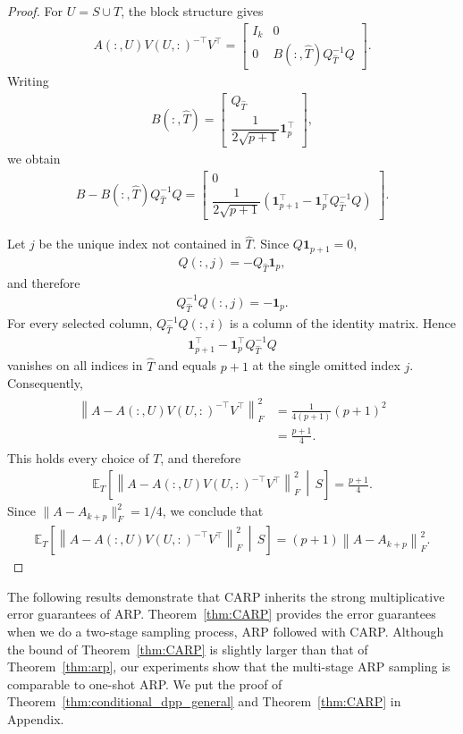 \documentclass[11pt]{article}
\newcommand{\be}{\begin{eqnarray}}
\newcommand{\ee}{\end{eqnarray}}
\newcommand{\<}{\langle}
\renewcommand{\>}{\rangle}
\begin{document}
\begin{proof}
For $U=S\cup T$, the block structure gives
\be
A(:,U)V(U,:)^{-\top}V^\top
=
\begin{bmatrix}
I_k & 0\\
0 &
B(:,\widehat T)Q_{\widehat T}^{-1}Q
\end{bmatrix}.
\ee
Writing
\be
B(:,\widehat T)
=
\begin{bmatrix}
Q_{\widehat T}\\[1mm]
\dfrac{1}{2\sqrt{p+1}}\mathbf{1}_p^\top
\end{bmatrix},
\ee
we obtain
\be
B-
B(:,\widehat T)Q_{\widehat T}^{-1}Q
=
\begin{bmatrix}
0\\[1mm]
\dfrac{1}{2\sqrt{p+1}}
\left(
\mathbf{1}_{p+1}^\top
-
\mathbf{1}_p^\top Q_{\widehat T}^{-1}Q
\right)
\end{bmatrix}.
\ee

Let $j$ be the unique index not contained in $\widehat T$.
Since $Q\mathbf{1}_{p+1}=0$,
\be
Q(:,j)
=
-Q_{\widehat T}\mathbf{1}_p,
\ee
and therefore
\be
Q_{\widehat T}^{-1}Q(:,j)
=
-\mathbf{1}_p.
\ee
For every selected column, $Q_{\widehat T}^{-1}Q(:,i)$ is a
column of the identity matrix. Hence
\be
\mathbf{1}_{p+1}^\top
-
\mathbf{1}_p^\top Q_{\widehat T}^{-1}Q
\ee
vanishes on all indices in $\widehat T$ and equals $p+1$ at the
single omitted index $j$. Consequently,
\be
\begin{aligned}
\left\|
A-A(:,U)V(U,:)^{-\top}V^\top
\right\|_F^2
&=
\frac{1}{4(p+1)}(p+1)^2\\
&=
\frac{p+1}{4}.
\end{aligned}
\ee
This holds every choice of $T$, and therefore
\be
\mathbb{E}_T
\left[
\left\|
A-A(:,U)V(U,:)^{-\top}V^\top
\right\|_F^2
\,\middle|\,S
\right]
=
\frac{p+1}{4}.
\ee
Since $\|A-A_{k+p}\|_F^2=1/4$, we conclude that
\be
\mathbb{E}_T
\left[
\left\|
A-A(:,U)V(U,:)^{-\top}V^\top
\right\|_F^2
\,\middle|\,S
\right]
=
(p+1)\left\|A-A_{k+p}\right\|_F^2.
\ee
\end{proof}

The following results demonstrate that CARP inherits the strong multiplicative error guarantees of ARP\cite{cortinovis2025arp}.  Theorem~\ref{thm:CARP} provides the error guarantees when we do a two-stage sampling process, ARP followed with CARP. Although the bound of Theorem~\ref{thm:CARP} is slightly larger than that of Theorem~\ref{thm:arp}, our experiments show that the multi-stage ARP sampling is comparable to one-shot ARP. We put the proof of Theorem~\ref{thm:conditional_dpp_general} and Theorem~\ref{thm:CARP} in Appendix.
\end{document}
